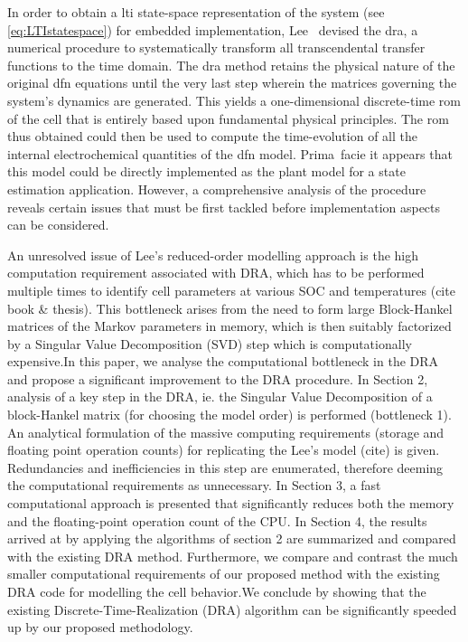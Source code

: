 In  order  to  obtain  a  \gls{lti} state-space  representation  of  the  system
(see \cref{eq:LTIstatespace}) for  embedded implementation,  Lee~\etal{} devised
the   \gls{dra},  a   numerical  procedure   to  systematically   transform  all
transcendental  transfer functions  to  the time  domain.  The \gls{dra}  method
retains  the physical  nature  of  the original  \gls{dfn}  equations until  the
very  last  step  wherein  the  matrices governing  the  system's  dynamics  are
generated. This  yields a  one-dimensional discrete-time  \gls{rom} of  the cell
that is entirely based upon  fundamental physical principles. The \gls{rom} thus
obtained could  then be used to  compute the time-evolution of  all the internal
electrochemical quantities of  the \gls{dfn} model. Prima~facie  it appears that
this  model  could be  directly  implemented  as the  plant  model  for a  state
estimation  application.  However, a  comprehensive  analysis  of the  procedure
reveals certain issues that must  be first tackled before implementation aspects
can be considered.


An unresolved issue of Lee\textquoteright  s reduced-order modelling approach is
the high computation requirement associated with  DRA, which has to be performed
multiple  times to  identify cell  parameters  at various  SOC and  temperatures
(cite  book \&  thesis). This  bottleneck  arises from  the need  to form  large
Block-Hankel matrices of the Markov parameters in memory, which is then suitably
factorized by a Singular Value Decomposition (SVD) step which is computationally
expensive.In this paper, we analyse the  computational bottleneck in the DRA and
propose a significant  improvement to the DRA procedure. In  Section 2, analysis
of a key step in the DRA, ie. the Singular Value Decomposition of a block-Hankel
matrix (for choosing the model order) is performed (bottleneck 1). An analytical
formulation of  the massive computing  requirements (storage and  floating point
operation  counts) for  replicating  the Lee\textquoteright  s  model (cite)  is
given. Redundancies  and inefficiencies in  this step are  enumerated, therefore
deeming  the computational  requirements as  unnecessary. In  Section 3,  a fast
computational approach is  presented that significantly reduces  both the memory
and the  floating-point operation count  of the CPU.  In Section 4,  the results
arrived at by  applying the algorithms of section 2  are summarized and compared
with the  existing DRA  method. Furthermore,  we compare  and contrast  the much
smaller computational requirements of our  proposed method with the existing DRA
code for  modelling the cell behavior.We  conclude by showing that  the existing
Discrete-Time-Realization (DRA) algorithm can be significantly speeded up by our
proposed methodology.

